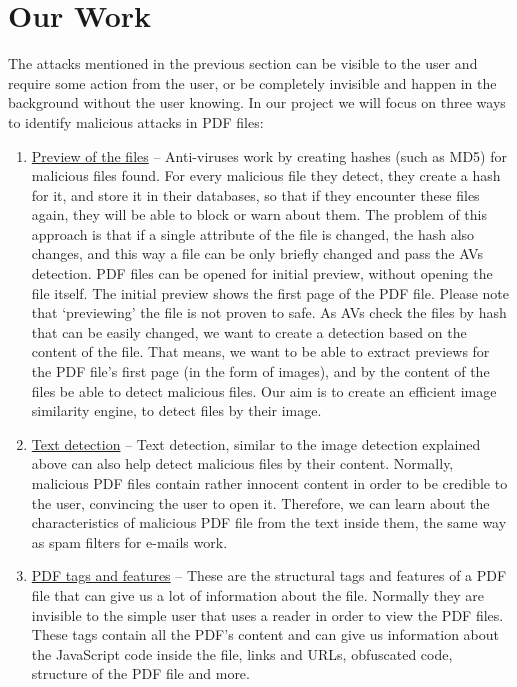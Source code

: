 \documentclass{article}
\begin{document}
\section{Our Work}
\indent The attacks mentioned in the previous section can be visible to the user and require some action from the user, or be completely invisible and happen in the background without the user knowing. In our project we will focus on three ways to identify malicious attacks in PDF files:

\begin{enumerate}
	\item \underline{Preview of the files} – Anti-viruses work by creating hashes (such as MD5) for malicious files found. For every malicious file they detect, they create a hash for it, and store it in their databases, so that if they encounter these files again, they will be able to block or warn about them. The problem of this approach is that if a single attribute of the file is changed, the hash also changes, and this way a file can be only briefly changed and pass the AVs detection. PDF files can be opened for initial preview, without opening the file itself. The initial preview shows the first page of the PDF file. Please note that ‘previewing’ the file is not proven to safe.\newline
	As AVs check the files by hash that can be easily changed, we want to create a detection based on the content of the file. That means, we want to be able to extract previews for the PDF file’s first page (in the form of images), and by the content of the files be able to detect malicious files. Our aim is to create an efficient image similarity engine, to detect files by their image.
	\item \underline{Text detection} – Text detection, similar to the image detection explained above can also help detect malicious files by their content. Normally, malicious PDF files contain rather innocent content in order to be credible to the user, convincing the user to open it. Therefore, we can learn about the characteristics of malicious PDF file from the text inside them, the same way as spam filters for e-mails work.
	\item \underline{PDF tags and features} – These are the structural tags and features of a PDF file that can give us a lot of information about the file. Normally they are invisible to the simple user that uses a reader in order to view the PDF files. These tags contain all the PDF's content and can give us information about the JavaScript code inside the file, links and URLs, obfuscated code, structure of the PDF file and more.
\end{enumerate}
\end{document}
